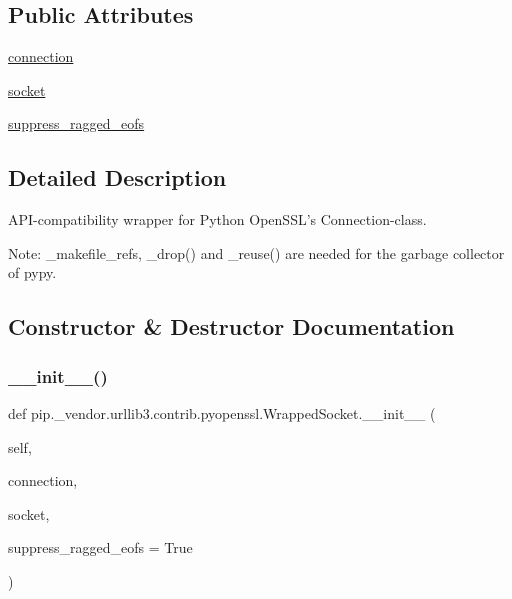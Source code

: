\subsection*{Public Attributes}
\begin{DoxyCompactItemize}
\item 
\hyperlink{classpip_1_1__vendor_1_1urllib3_1_1contrib_1_1pyopenssl_1_1WrappedSocket_a5e45c572e33de518587cde6e2974f01e}{connection}
\item 
\hyperlink{classpip_1_1__vendor_1_1urllib3_1_1contrib_1_1pyopenssl_1_1WrappedSocket_a6597c4724062e3e12dd08b65b3d61c5c}{socket}
\item 
\hyperlink{classpip_1_1__vendor_1_1urllib3_1_1contrib_1_1pyopenssl_1_1WrappedSocket_a45866f7be30e2912cb4c40342440b6da}{suppress\+\_\+ragged\+\_\+eofs}
\end{DoxyCompactItemize}


\subsection{Detailed Description}
\begin{DoxyVerb}API-compatibility wrapper for Python OpenSSL's Connection-class.

Note: _makefile_refs, _drop() and _reuse() are needed for the garbage
collector of pypy.
\end{DoxyVerb}
 

\subsection{Constructor \& Destructor Documentation}
\mbox{\label{classpip_1_1__vendor_1_1urllib3_1_1contrib_1_1pyopenssl_1_1WrappedSocket_a0b0ecb92f470f209dc5802180f206dd3}} 
\subsubsection{\texorpdfstring{\+\_\+\+\_\+init\+\_\+\+\_\+()}{\_\_init\_\_()}}
{\footnotesize\ttfamily def pip.\+\_\+vendor.\+urllib3.\+contrib.\+pyopenssl.\+Wrapped\+Socket.\+\_\+\+\_\+init\+\_\+\+\_\+ (\begin{DoxyParamCaption}\item[{}]{self,  }\item[{}]{connection,  }\item[{}]{socket,  }\item[{}]{suppress\+\_\+ragged\+\_\+eofs = {\ttfamily True} }\end{DoxyParamCaption})}



